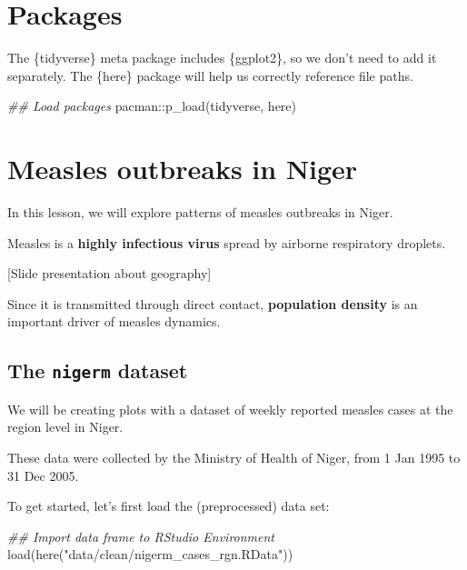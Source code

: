 \documentclass[
  letterpaper,
  DIV=11,
  numbers=noendperiod]{scrreprt}
\newenvironment{Shaded}{\begin{snugshade}}{\end{snugshade}}
\newcommand{\DocumentationTok}[1]{\textcolor[rgb]{0.37,0.37,0.37}{\textit{#1}}}
\newcommand{\FunctionTok}[1]{\textcolor[rgb]{0.28,0.35,0.67}{#1}}
\newcommand{\NormalTok}[1]{\textcolor[rgb]{0.00,0.23,0.31}{#1}}
\newcommand{\SpecialCharTok}[1]{\textcolor[rgb]{0.37,0.37,0.37}{#1}}
\newcommand{\StringTok}[1]{\textcolor[rgb]{0.13,0.47,0.30}{#1}}
\begin{document}
\section{Packages}\label{packages-9}

The \{tidyverse\} meta package includes \{ggplot2\}, so we don't need to
add it separately. The \{here\} package will help us correctly reference
file paths.

\begin{Shaded}
\begin{Highlighting}[]
\DocumentationTok{\#\# Load packages }
\NormalTok{pacman}\SpecialCharTok{::}\FunctionTok{p\_load}\NormalTok{(tidyverse,}
\NormalTok{               here)}
\end{Highlighting}
\end{Shaded}

\section{Measles outbreaks in Niger}\label{measles-outbreaks-in-niger}

In this lesson, we will explore patterns of measles outbreaks in Niger.

Measles is a \textbf{highly infectious virus} spread by airborne
respiratory droplets.

{[}Slide presentation about geography{]}

Since it is transmitted through direct contact, \textbf{population
density} is an important driver of measles dynamics.

\subsection{\texorpdfstring{The \texttt{nigerm}
dataset}{The nigerm dataset}}\label{the-nigerm-dataset}

We will be creating plots with a dataset of weekly reported measles
cases at the region level in Niger.

These data were collected by the Ministry of Health of Niger, from 1 Jan
1995 to 31 Dec 2005.

To get started, let's first load the (preprocessed) data set:

\begin{Shaded}
\begin{Highlighting}[]
\DocumentationTok{\#\# Import data frame to RStudio Environment}
\FunctionTok{load}\NormalTok{(}\FunctionTok{here}\NormalTok{(}\StringTok{"data/clean/nigerm\_cases\_rgn.RData"}\NormalTok{))}
\end{Highlighting}
\end{Shaded}
\end{document}
